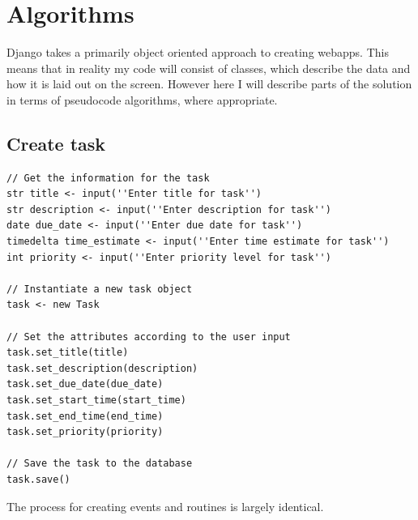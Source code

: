 \documentclass{article}
\begin{document}
\section{Algorithms}
Django takes a primarily object oriented approach to creating webapps.
This means that in reality my code will consist of classes,
which describe the data and how it is laid out on the screen.
However here I will describe parts of the solution in terms of pseudocode algorithms,
where appropriate.

\subsection{Create task}
\begin{lstlisting}[breaklines]
// Get the information for the task
str title <- input(''Enter title for task'')
str description <- input(''Enter description for task'')
date due_date <- input(''Enter due date for task'')
timedelta time_estimate <- input(''Enter time estimate for task'')
int priority <- input(''Enter priority level for task'')

// Instantiate a new task object
task <- new Task

// Set the attributes according to the user input
task.set_title(title)
task.set_description(description)
task.set_due_date(due_date)
task.set_start_time(start_time)
task.set_end_time(end_time)
task.set_priority(priority)

// Save the task to the database
task.save()
\end{lstlisting}

The process for creating events and routines is largely identical.
\end{document}
